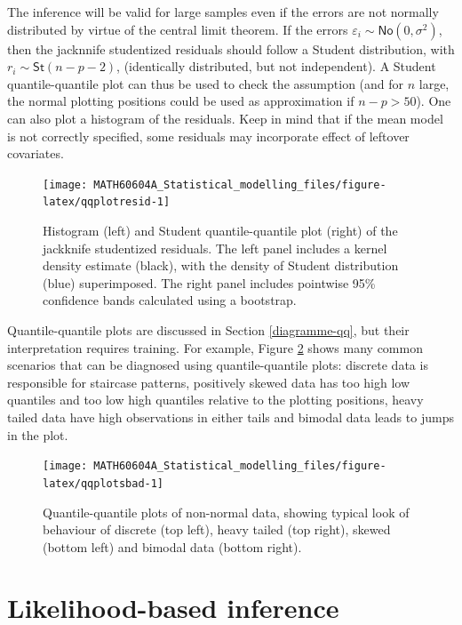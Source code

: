 \documentclass[
  11pt,
  letterpaper,
]{book}
\theoremstyle{definition}
\theoremstyle{definition}
\theoremstyle{definition}
\theoremstyle{remark}
\begin{document}
The inference will be valid for large samples even if the errors are not normally distributed by virtue of the central limit theorem. If the errors \(\varepsilon_i \sim \mathsf{No}(0, \sigma^2)\), then the jacknnife studentized residuals should follow a Student distribution, with \(r_i \sim \mathsf{St}(n-p-2)\), (identically distributed, but not independent). A Student quantile-quantile plot can thus be used to check the assumption (and for \(n\) large, the normal plotting positions could be used as approximation if \(n-p> 50\)). One can also plot a histogram of the residuals. Keep in mind that if the mean model is not correctly specified, some residuals may incorporate effect of leftover covariates.

\begin{figure}

{\centering \texttt{[image: MATH60604A\_Statistical\_modelling\_files/figure-latex/qqplotresid-1]} 

}

\caption{Histogram (left) and Student quantile-quantile plot (right) of the jackknife studentized residuals. The left panel includes a kernel density estimate (black), with the density of Student distribution (blue) superimposed. The right panel includes pointwise 95\% confidence bands calculated using a bootstrap.}\label{fig:qqplotresid}
\end{figure}

Quantile-quantile plots are discussed in Section \ref{diagramme-qq}, but their interpretation requires training. For example, Figure \ref{fig:qqplotsbad} shows many common scenarios that can be diagnosed using quantile-quantile plots: discrete data is responsible for staircase patterns, positively skewed data has too high low quantiles and too low high quantiles relative to the plotting positions, heavy tailed data have high observations in either tails and bimodal data leads to jumps in the plot.

\begin{figure}

{\centering \texttt{[image: MATH60604A\_Statistical\_modelling\_files/figure-latex/qqplotsbad-1]} 

}

\caption{Quantile-quantile plots of non-normal data, showing typical look of behaviour of discrete (top left), heavy tailed  (top right), skewed (bottom left) and bimodal data (bottom right).}\label{fig:qqplotsbad}
\end{figure}

\hypertarget{likelihood}{%
\chapter{Likelihood-based inference}\label{likelihood}}
\end{document}
